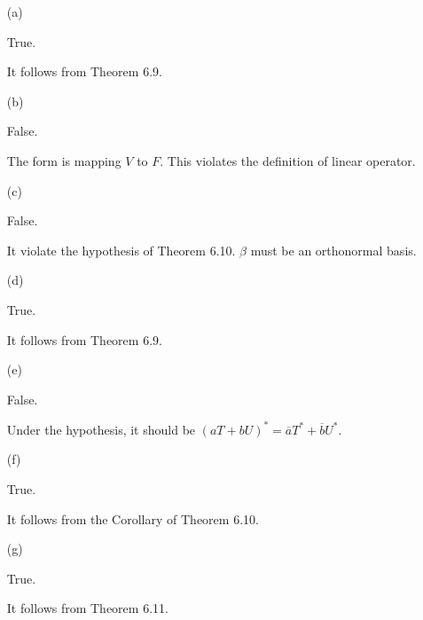 \begin{Exercise}
\begin{enumerate}[(a)]
\item[(a)]
\begin{answer}
True.
\end{answer}
\begin{solution}
It follows from Theorem 6.9.
\end{solution}

\item[(b)]
\begin{answer}
False.
\end{answer}
\begin{solution}
The form is mapping $V$ to $F$. This violates the definition of linear operator.
\end{solution}

\item[(c)]
\begin{answer}
False.
\end{answer}
\begin{solution}
It violate the hypothesis of Theorem 6.10. $\beta$ must be an orthonormal basis.
\end{solution}

\item[(d)]
\begin{answer}
True.
\end{answer}
\begin{solution}
It follows from Theorem 6.9.
\end{solution}

\item[(e)]
\begin{answer}
False.
\end{answer}
\begin{solution}
Under the hypothesis, it should be $(a T + b U)^* = \overline{a}T^* + \overline{b}U^*$.
\end{solution}

\item[(f)]
\begin{answer}
True.
\end{answer}
\begin{solution}
It follows from the Corollary of Theorem 6.10.
\end{solution}

\item[(g)]
\begin{answer}
True.
\end{answer}
\begin{solution}
It follows from Theorem 6.11.
\end{solution}

\end{enumerate}
\end{Exercise}